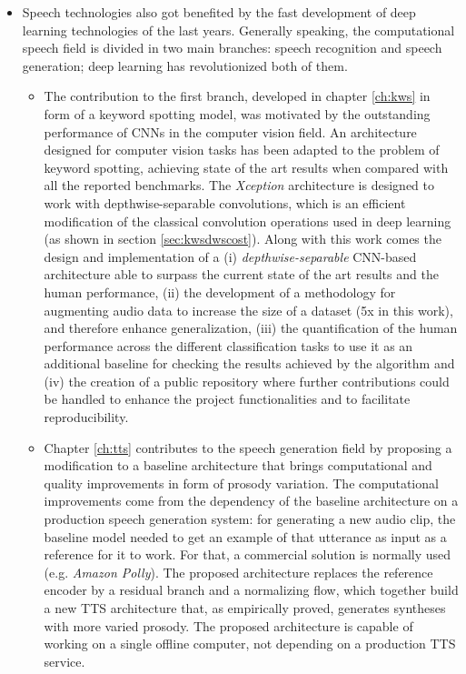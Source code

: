 \begin{itemize}
\item Speech technologies also got benefited by the fast development of deep learning technologies of the last years. Generally speaking, the computational speech field is divided in two main branches: speech recognition and speech generation; deep learning has revolutionized both of them. 
	\begin{itemize}
		\item The contribution to the first branch, developed in chapter \ref{ch:kws} in form of a keyword spotting model, was motivated by the outstanding performance of CNNs in the computer vision field. An architecture designed for computer vision tasks has been adapted to the problem of keyword spotting, achieving state of the art results when compared with all the reported benchmarks. The \textit{Xception} architecture is designed to work with depthwise-separable convolutions, which is an efficient modification of the classical convolution operations used in deep learning (as shown in section \ref{sec:kwsdwscost}). Along with this work comes the design and implementation of a (i) \textit{depthwise-separable} CNN-based architecture able to surpass the current state of the art results and the human performance, (ii) the development of a methodology for augmenting audio data to increase the size of a dataset (5x in this work), and therefore enhance generalization, (iii) the quantification of the human performance across the different classification tasks to use it as an additional baseline for checking the results achieved by the algorithm and (iv) the creation of a public repository where further contributions could be handled to enhance the project functionalities and to facilitate reproducibility.
		\item Chapter \ref{ch:tts} contributes to the speech generation field by proposing a modification to a baseline architecture that brings computational and quality improvements in form of prosody variation. The computational improvements come from the dependency of the baseline architecture on a production speech generation system: for generating a new audio clip, the baseline model needed to get an example of that utterance as input as a reference for it to work. For that, a commercial solution is normally used (e.g. \textit{Amazon Polly}). The proposed architecture replaces the reference encoder by a residual branch and a normalizing flow, which together build a new TTS architecture that, as empirically proved, generates syntheses with more varied prosody. The proposed architecture is capable of working on a single offline computer, not depending on a production TTS service. 
	\end{itemize}
\end{itemize}


